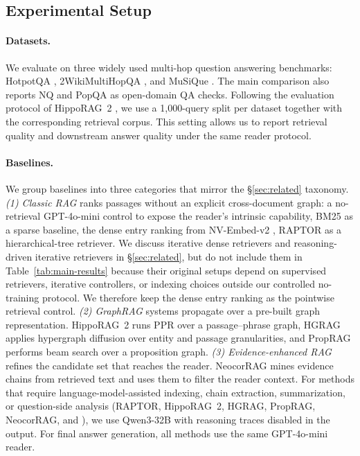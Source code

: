 \subsection{Experimental Setup}
\label{sec:experiments:setup}

\paragraph{Datasets.}
We evaluate on three widely used multi-hop question answering
benchmarks: HotpotQA \citep{yang2018hotpotqa}, 2WikiMultiHopQA
\citep{ho2020constructing}, and MuSiQue \citep{trivedi2022musique}.
The main comparison also reports NQ and PopQA as open-domain QA checks.
Following the evaluation protocol of HippoRAG~2
\citep{gutierrez2025hipporag}, we use a 1{,}000-query split per dataset
together with the corresponding retrieval corpus. This setting allows
us to report retrieval quality and downstream answer quality under the
same reader protocol.

\paragraph{Baselines.}
We group baselines into three categories that mirror the
\S\ref{sec:related} taxonomy.
\emph{(1) Classic RAG} ranks passages without an explicit
cross-document graph: a no-retrieval GPT-4o-mini control to expose
the reader's intrinsic capability, BM25 \citep{robertson2009bm25}
as a sparse baseline, the dense entry ranking from NV-Embed-v2
\citep{lee2025nvembed}, RAPTOR \citep{sarthi2024raptor} as a
hierarchical-tree retriever. We discuss iterative dense retrievers
and reasoning-driven iterative retrievers in \S\ref{sec:related}, but
do not include them in Table~\ref{tab:main-results} because their
original setups depend on supervised retrievers, iterative controllers,
or indexing choices outside our controlled no-training protocol.
We therefore keep the dense entry ranking as the pointwise retrieval
control.
\emph{(2) GraphRAG} systems propagate over a pre-built graph
representation. HippoRAG~2 \citep{gutierrez2025hipporag} runs PPR
over a passage--phrase graph, HGRAG \citep{hgrag2024} applies
hypergraph diffusion over entity and passage granularities, and
PropRAG \citep{wang2025proprag} performs beam search over a
proposition graph.
\emph{(3) Evidence-enhanced RAG} refines the candidate set
that reaches the reader. NeocorRAG \citep{peng2026neocorrag} mines
evidence chains from retrieved text and uses them to filter the
reader context.
For methods that require language-model-assisted indexing, chain
extraction, summarization, or question-side analysis (RAPTOR,
HippoRAG~2, HGRAG, PropRAG, NeocorRAG, and \methodname{}),
we use Qwen3-32B with reasoning traces disabled in the output. For
final answer generation, all methods use the same GPT-4o-mini
reader.

